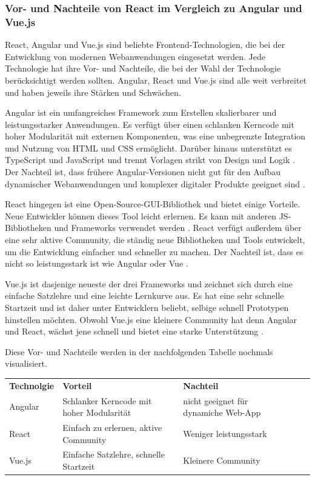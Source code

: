 \subsubsection{Vor- und Nachteile von React im Vergleich zu Angular und Vue.js}
React, Angular und Vue.js sind beliebte Frontend-Technologien, die bei der Entwicklung von modernen Webanwendungen eingesetzt werden. Jede Technologie hat ihre Vor- und Nachteile, die bei der Wahl der Technologie berücksichtigt werden sollten.
Angular, React und Vue.js sind alle weit verbreitet und haben jeweils ihre Stärken und Schwächen.

Angular ist ein umfangreiches Framework zum Erstellen skalierbarer und leistungsstarker Anwendungen. Es verfügt über einen schlanken Kerncode mit hoher Modularität mit externen Komponenten, was eine unbegrenzte Integration und Nutzung von HTML und CSS ermöglicht. Darüber hinaus unterstützt es TypeScript und JavaScript und trennt Vorlagen strikt von Design und Logik \cite{hosttest2021}. Der Nachteil ist, dass frühere Angular-Versionen nicht gut für den Aufbau dynamischer Webanwendungen und komplexer digitaler Produkte geeignet sind \cite{ichi2023}.

React hingegen ist eine Open-Source-GUI-Bibliothek und bietet einige Vorteile. Neue Entwickler können dieses Tool leicht erlernen. Es kann mit anderen JS-Bibliotheken und Frameworks verwendet werden \cite{softwaredeveloperindia2022}. React verfügt außerdem über eine sehr aktive Community, die ständig neue Bibliotheken und Tools entwickelt, um die Entwicklung einfacher und schneller zu machen. Der Nachteil ist, dass es nicht so leistungsstark ist wie Angular oder Vue \cite{logrocket2021}.

Vue.js ist dasjenige neueste der drei Frameworks und zeichnet sich durch eine einfache Satzlehre und eine leichte Lernkurve aus. Es hat eine sehr schnelle Startzeit und ist daher unter Entwicklern beliebt, selbige schnell Prototypen hinstellen möchten\cite{logrocket2021}. Obwohl Vue.js eine kleinere Community hat denn Angular und React, wächst jene schnell und bietet eine starke Unterstützung \cite{codeinwp}.

Diese Vor- und Nachteile werden in der nachfolgenden Tabelle nochmals visualisiert.
\begin{center}
\begin{table}[h]
	\begin{tabularx}{4cm}{|l|l|p{4.5 cm}|ll}
		\cline{1-3}
		\textbf{Technolgie} & \textbf{Vorteil}                         & \textbf{Nachteil}                                                &  &  \\ \cline{1-3}
		Angular             & Schlanker Kerncode mit hoher Modularität & nicht geeignet für dynamiche Web-App  &  &  \\ \cline{1-3}
		React               & Einfach zu erlernen, aktive Community    & Weniger leistungsstark         &  &  \\ \cline{1-3}
		Vue.js              & Einfache Satzlehre, schnelle Startzeit   & Kleinere Community             &  &  \\ \cline{1-3}
	\end{tabularx}
\end{table}
\end{center}

